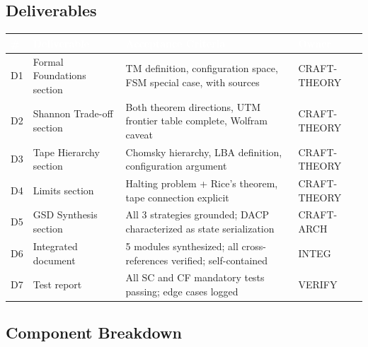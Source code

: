 \documentclass[11pt,letterpaper]{article}
\newcommand{\tableheader}[1]{\textbf{\sffamily\textcolor{white}{#1}}}
\begin{document}
\subsection{Deliverables}

\begin{center}
\begin{tabularx}{\textwidth}{C{0.5cm}L{3.5cm}XC{2.5cm}}
\toprule
{}
\tableheader{\#} & \tableheader{Deliverable} & \tableheader{Acceptance Criteria} & \tableheader{Owner} \\
\midrule
D1 & Formal Foundations section & TM definition, configuration space, FSM special case, with sources & CRAFT-THEORY \\
D2 & Shannon Trade-off section & Both theorem directions, UTM frontier table complete, Wolfram caveat & CRAFT-THEORY \\
D3 & Tape Hierarchy section & Chomsky hierarchy, LBA definition, configuration argument & CRAFT-THEORY \\
D4 & Limits section & Halting problem + Rice's theorem, tape connection explicit & CRAFT-THEORY \\
D5 & GSD Synthesis section & All 3 strategies grounded; DACP characterized as state serialization & CRAFT-ARCH \\
D6 & Integrated document & 5 modules synthesized; all cross-references verified; self-contained & INTEG \\
D7 & Test report & All SC and CF mandatory tests passing; edge cases logged & VERIFY \\
\bottomrule
\end{tabularx}
\end{center}

\subsection{Component Breakdown}
\end{document}
